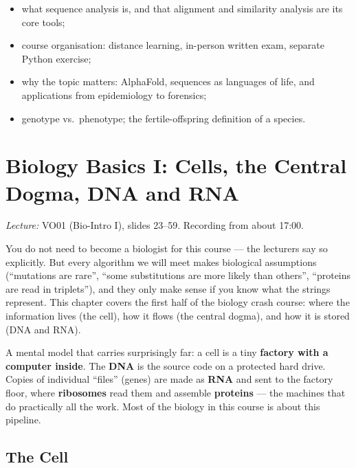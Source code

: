 \documentclass[11pt, oneside]{book}
\newcommand{\lectureref}[1]{%
  \par{\small\color{gray!70!black}\textit{Lecture:} #1}\par}
\let\originalsection\section
\renewcommand{\section}{\Needspace{7\baselineskip}\originalsection}
\begin{document}
\begin{itemize}
  \item what sequence analysis is, and that alignment and similarity analysis
    are its core tools;
  \item course organisation: distance learning, in-person written exam,
    separate Python exercise;
  \item why the topic matters: AlphaFold, sequences as languages of life,
    and applications from epidemiology to forensics;
  \item genotype vs.\ phenotype; the fertile-offspring definition of a species.
\end{itemize}

\chapter{Biology Basics I: Cells, the Central Dogma, DNA and RNA}
\label{ch:bio1}

\lectureref{VO01 (Bio-Intro I), slides 23--59. Recording from about 17:00.}

You do not need to become a biologist for this course --- the lecturers
say so explicitly. But every algorithm we will meet makes biological
assumptions (``mutations are rare'', ``some substitutions are more likely
than others'', ``proteins are read in triplets''), and they only make sense
if you know what the strings represent. This chapter covers the first half
of the biology crash course: where the information lives (the cell), how it
flows (the central dogma), and how it is stored (DNA and RNA).

\begin{intbox}
A mental model that carries surprisingly far: a cell is a tiny
\textbf{factory with a computer inside}. The \textbf{DNA} is the source code
on a protected hard drive. Copies of individual ``files'' (genes) are made as
\textbf{RNA} and sent to the factory floor, where \textbf{ribosomes} read them
and assemble \textbf{proteins} --- the machines that do practically all the
work. Most of the biology in this course is about this pipeline.
\end{intbox}

\section{The Cell}
\end{document}
